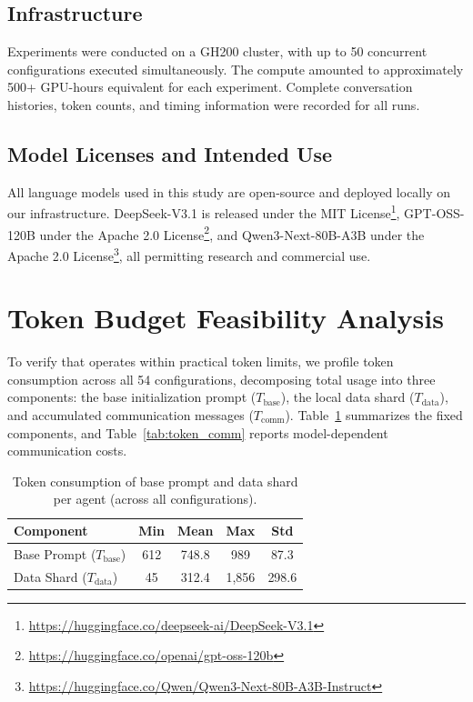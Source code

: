 \subsection{Infrastructure}

Experiments were conducted on a GH200 cluster, with up to 50 concurrent configurations executed simultaneously. The compute amounted to approximately 500+ GPU-hours equivalent for each experiment. Complete conversation histories, token counts, and timing information were recorded for all runs.

\subsection{Model Licenses and Intended Use}
\label{app:licenses}

All language models used in this study are open-source and deployed locally on our infrastructure. DeepSeek-V3.1 is released under the MIT License\footnote{\url{https://huggingface.co/deepseek-ai/DeepSeek-V3.1}}, GPT-OSS-120B under the Apache 2.0 License\footnote{\url{https://huggingface.co/openai/gpt-oss-120b}}, and Qwen3-Next-80B-A3B under the Apache 2.0 License\footnote{\url{https://huggingface.co/Qwen/Qwen3-Next-80B-A3B-Instruct}}, all permitting research and commercial use.


\section{Token Budget Feasibility Analysis}
\label{app:token_feasibility}

To verify that \silobench{} operates within practical token limits, we profile token consumption across all 54 configurations, decomposing total usage into three components: the base initialization prompt ($T_{\text{base}}$), the local data shard ($T_{\text{data}}$), and accumulated communication messages ($T_{\text{comm}}$). Table~\ref{tab:token_base_data} summarizes the fixed components, and Table~\ref{tab:token_comm} reports model-dependent communication costs.

\begin{table}[t]
\centering
\small
\renewcommand{\arraystretch}{1.2}
\begin{tabular}{@{}l cccc@{}}
\toprule
\textbf{Component} & \textbf{Min} & \textbf{Mean} & \textbf{Max} & \textbf{Std} \\
\midrule
Base Prompt ($T_{\text{base}}$) & 612 & 748.8 & 989 & 87.3 \\
Data Shard ($T_{\text{data}}$) & 45 & 312.4 & 1,856 & 298.6 \\
\bottomrule
\end{tabular}
\caption{Token consumption of base prompt and data shard per agent (across all configurations).}
\label{tab:token_base_data}
\end{table}

